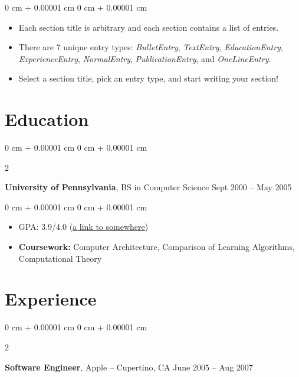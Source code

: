 \documentclass[10pt, letterpaper]{article}
\newenvironment{highlights}{
	\begin{itemize}[
		topsep=0.10 cm,
		parsep=0.10 cm,
		partopsep=0pt,
		itemsep=0pt,
		leftmargin=0 cm + 10pt
		]
	}{
	\end{itemize}
} %
\newenvironment{highlightsforbulletentries}{
	\begin{itemize}[
		topsep=0.10 cm,
		parsep=0.10 cm,
		partopsep=0pt,
		itemsep=0pt,
		leftmargin=10pt
		]
	}{
	\end{itemize}
} %
\newenvironment{onecolentry}{
	\begin{adjustwidth}{
			0 cm + 0.00001 cm
		}{
			0 cm + 0.00001 cm
		}
	}{
	\end{adjustwidth}
} %
\newenvironment{twocolentry}[2][]{
	\onecolentry
	\def\secondColumn{#2}
	\setcolumnwidth{\fill, 4.5 cm}
	\begin{paracol}{2}
	}{
		\switchcolumn \raggedleft \secondColumn
	\end{paracol}
	\endonecolentry
} %
\begin{document}
	\begin{onecolentry}
		\begin{highlightsforbulletentries}
			
			
			\item Each section title is arbitrary and each section contains a list of entries.
			
			\item There are 7 unique entry types: \textit{BulletEntry}, \textit{TextEntry}, \textit{EducationEntry}, \textit{ExperienceEntry}, \textit{NormalEntry}, \textit{PublicationEntry}, and \textit{OneLineEntry}.
			
			\item Select a section title, pick an entry type, and start writing your section!
			
					
		\end{highlightsforbulletentries}
	\end{onecolentry}
	
	\section{Education}
	
	
	
	
	\begin{twocolentry}{
			Sept 2000 – May 2005
		}
		\textbf{University of Pennsylvania}, BS in Computer Science\end{twocolentry}
	
	\vspace{0.10 cm}
	\begin{onecolentry}
		\begin{highlights}
			\item GPA: 3.9/4.0 (\href{https://example.com}{a link to somewhere})
			\item \textbf{Coursework:} Computer Architecture, Comparison of Learning Algorithms, Computational Theory
		\end{highlights}
	\end{onecolentry}
	
	
	
	
	\section{Experience}
	
	
	
	
	\begin{twocolentry}{
			June 2005 – Aug 2007
		}
		\textbf{Software Engineer}, Apple -- Cupertino, CA\end{twocolentry}
	
\end{document}
